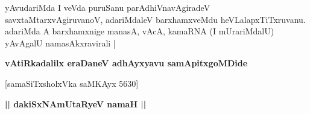 \begin{artha}
yAvudariMda I veVda puruSanu parAdhiVnavAgiradeV
savxtaMtarxvAgiruvanoV, adariMdaleV barxhamxveMdu
heVLalapxTiTxruvanu. adariMda A barxhamxnige manasA, vAcA, kamaRNA
(I mUrariMdalU) yAvAgalU namasAkxravirali |
\end{artha}

\begin{center}
\textbf{vAtiRkadalilx eraDaneV adhAyxyavu samApitxgoMDide }

\medskip

[samaSiTxsholxVka saMKAyx 5630]

\medskip

{\Large{\textbf{|| dakiSxNAmUtaRyeV namaH ||}}}
\end{center}
